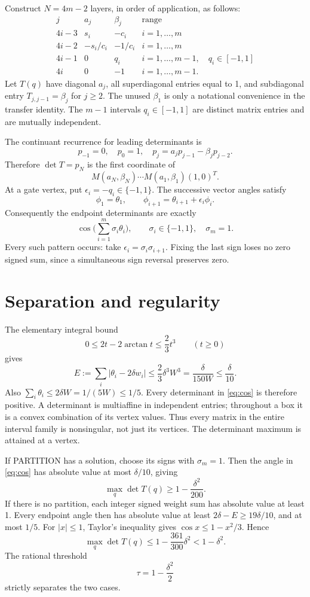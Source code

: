 Construct $N=4m-2$ layers, in order of application, as follows:
\[
\begin{array}{c|cc|l}
 j&a_j&\beta_j&\text{range}\\\hline
 4i-3&s_i&-c_i&i=1,\ldots,m\\
 4i-2&-s_i/c_i&-1/c_i&i=1,\ldots,m\\
 4i-1&0&q_i&i=1,\ldots,m-1,\quad q_i\in[-1,1]\\
 4i&0&-1&i=1,\ldots,m-1.
\end{array}
\]
Let $T(q)$ have diagonal $a_j$, all superdiagonal entries equal to 1, and subdiagonal entry $T_{j,j-1}=\beta_j$ for $j\ge2$. The unused $\beta_1$ is only a notational convenience in the transfer identity. The $m-1$ intervals $q_i\in[-1,1]$ are distinct matrix entries and are mutually independent.

The continuant recurrence for leading determinants is
\[
 p_{-1}=0,\quad p_0=1,\quad p_j=a_jp_{j-1}-\beta_jp_{j-2}.
\]
Therefore $\det T=p_N$ is the first coordinate of
\[
 M(a_N,\beta_N)\cdots M(a_1,\beta_1)(1,0)^T.
\]
At a gate vertex, put $\epsilon_i=-q_i\in\{-1,1\}$. The successive vector angles satisfy
\[
 \phi_1=\theta_1,\qquad \phi_{i+1}=\theta_{i+1}+\epsilon_i\phi_i.
\]
Consequently the endpoint determinants are exactly
\begin{equation}\label{eq:cos}
 \cos\Big(\sum_{i=1}^m\sigma_i\theta_i\Big),
 \qquad \sigma_i\in\{-1,1\},\quad\sigma_m=1.
\end{equation}
Every such pattern occurs: take $\epsilon_i=\sigma_i\sigma_{i+1}$. Fixing the last sign loses no zero signed sum, since a simultaneous sign reversal preserves zero.
\section{Separation and regularity}
The elementary integral bound
\[
 0\le2t-2\arctan t\le\frac23t^3\qquad(t\ge0)
\]
gives
\[
 E:=\sum_i|\theta_i-2\delta w_i|
 \le\frac23\delta^3W^3=\frac{\delta}{150W}\le\frac\delta{10}.
\]
Also $\sum_i\theta_i\le2\delta W=1/(5W)\le1/5$. Every determinant in \eqref{eq:cos} is therefore positive. A determinant is multiaffine in independent entries; throughout a box it is a convex combination of its vertex values. Thus every matrix in the entire interval family is nonsingular, not just its vertices. The determinant maximum is attained at a vertex.

If PARTITION has a solution, choose its signs with $\sigma_m=1$. Then the angle in \eqref{eq:cos} has absolute value at most $\delta/10$, giving
\[
 \max_q\det T(q)\ge1-\frac{\delta^2}{200}.
\]
If there is no partition, each integer signed weight sum has absolute value at least 1. Every endpoint angle then has absolute value at least $2\delta-E\ge19\delta/10$, and at most $1/5$. For $|x|\le1$, Taylor's inequality gives $\cos x\le1-x^2/3$. Hence
\[
 \max_q\det T(q)\le1-\frac{361}{300}\delta^2<1-\delta^2.
\]
The rational threshold
\[
 \tau=1-\frac{\delta^2}{2}
\]
strictly separates the two cases.

